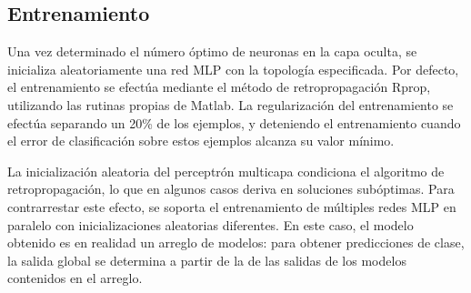 %
\subsection{Entrenamiento}
%
Una vez determinado el número óptimo de neuronas en la capa oculta,
se inicializa aleatoriamente una red MLP con la topología especificada.
Por defecto, el entrenamiento se efectúa mediante el método de
retropropagación Rprop, utilizando las rutinas propias de Matlab.
La regularización del entrenamiento se efectúa separando un 20\% de
los ejemplos, y deteniendo el entrenamiento cuando el error de
clasificación sobre estos ejemplos alcanza su valor mínimo.

La inicialización aleatoria del perceptrón multicapa condiciona el
algoritmo de retropropagación, lo que en algunos casos deriva en
soluciones subóptimas.
Para contrarrestar este efecto, se soporta el entrenamiento de
múltiples redes MLP en paralelo con inicializaciones aleatorias
diferentes.
En este caso, el modelo obtenido es en realidad un arreglo de modelos:
para obtener predicciones de clase, la salida global se determina a
partir de la  de las salidas de los modelos contenidos en el
arreglo.
